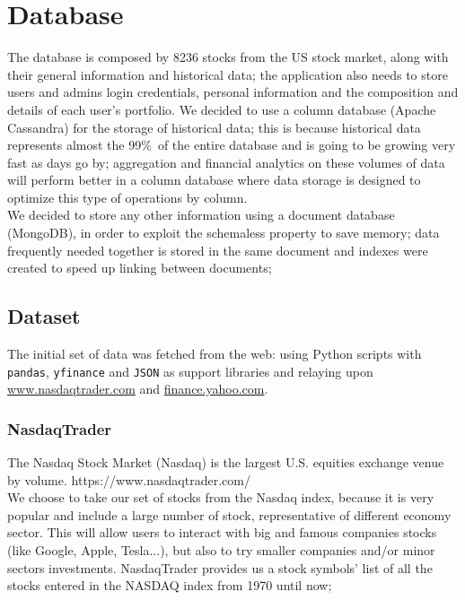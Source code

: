 \chapter{Database}
The database is composed by 8236 stocks from the US stock market, along with
their general information and historical data; the application also needs to
store users and admins login credentials, personal information and the
composition and details of each user's portfolio.
We decided to use a column database (Apache Cassandra) for the storage of
historical data; this is because historical data represents almost the 99\%\ of
the entire database and is going to be growing very fast as days go by;
aggregation and financial analytics on these volumes of data will perform better
in a column database where data storage is designed to optimize this type of
operations by column.\\
We decided to store any other information using a document database (MongoDB),
in order to exploit the schemaless property to save memory; data frequently
needed together is stored in the same document and indexes were created to speed
up linking between documents; 

\section{Dataset}
The initial set of data was fetched from the web: using Python scripts with
\texttt{pandas}, \texttt{yfinance} and \texttt{JSON} as support libraries and
relaying upon \url{www.nasdaqtrader.com} and \url{finance.yahoo.com}.
\subsection{NasdaqTrader}
The Nasdaq Stock Market (Nasdaq) is the largest U.S. equities exchange venue by volume. 
https://www.nasdaqtrader.com/ \\
We choose to take our set of stocks from the Nasdaq index, because it is very popular and
include a large number of stock, representative of different economy sector. This will allow 
users to interact with big and famous companies stocks (like Google, Apple, Tesla...), but also
to try smaller companies and/or minor sectors investments. 
NasdaqTrader provides us a stock symbols' list of all the stocks entered in the NASDAQ index
from 1970 until now;
